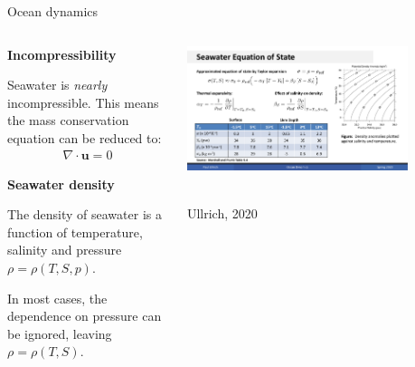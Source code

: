 \documentclass[aspectratio=169,xcolor=dvipsnames]{beamer}
\newcommand\credit[2]{
        \\ \vspace{-0.5em}
        {\color{gray}\scriptsize
        \hfill
        #1
        \hspace{#2}}
        }
\begin{document}
\begin{frame}[t]{Ocean dynamics}
       
\small  

\vspace{-1.5em}


\begin{columns}
    \begin{column}[t]{0.5\textwidth}
        \begin{center}
        \textbf{{\large
        Incompressibility
        }}
        \end{center}

        Seawater is \emph{nearly} incompressible. This means the mass conservation equation can be reduced to:
        \begin{align*}
            \nabla \cdot \mathbf{u} = 0
        \end{align*}

        \vspace{1em}
        
        \begin{center}
            \textbf{{\large
            Seawater density
            }}
        \end{center}
        
        The density of seawater is a function of temperature, salinity and pressure $\rho = \rho(T, S, p)$.

        In most cases, the dependence on pressure can be ignored, leaving $\rho = \rho(T, S)$.
        
    \end{column}
    \begin{column}[t]{0.5\textwidth}

        \begin{center}
        \includegraphics[width=0.8\textwidth]{figs/Fig-density-anomalies-Ullrich2020.pdf}
        \credit{Ullrich, 2020}{15pt}
        \end{center}
        
    \end{column}
\end{columns}
        
\end{frame}
\end{document}
